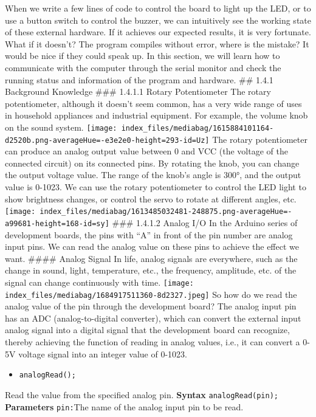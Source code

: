 \documentclass[
  letterpaper,
  DIV=11,
  numbers=noendperiod]{scrreprt}
\providecommand{\tightlist}{%
  \setlength{\itemsep}{0pt}\setlength{\parskip}{0pt}}\usepackage{longtable,booktabs,array}
\begin{document}
When we write a few lines of code to control the board to light up the
LED, or to use a button switch to control the buzzer, we can intuitively
see the working state of these external hardware. If it achieves our
expected results, it is very fortunate. What if it doesn't? The program
compiles without error, where is the mistake? It would be nice if they
could speak up. In this section, we will learn how to communicate with
the computer through the serial monitor and check the running status and
information of the program and hardware. \#\# 1.4.1 Background Knowledge
\#\#\# 1.4.1.1 Rotary Potentiometer The rotary potentiometer, although
it doesn't seem common, has a very wide range of uses in household
appliances and industrial equipment. For example, the volume knob on the
sound system.
\texttt{[image: index\_files/mediabag/1615884101164-d2520b.png-averageHue=-e3e2e0-height=293-id=Uz]}
The rotary potentiometer can produce an analog output value between 0
and VCC (the voltage of the connected circuit) on its connected pins. By
rotating the knob, you can change the output voltage value. The range of
the knob's angle is 300°, and the output value is 0-1023. We can use the
rotary potentiometer to control the LED light to show brightness
changes, or control the servo to rotate at different angles, etc.
\texttt{[image: index\_files/mediabag/1613485032481-248875.png-averageHue=-a99681-height=168-id=sy]}
\#\#\# 1.4.1.2 Analog I/O In the Arduino series of development boards,
the pins with ``A'' in front of the pin number are analog input pins. We
can read the analog value on these pins to achieve the effect we want.
\#\#\#\# Analog Signal In life, analog signals are everywhere, such as
the change in sound, light, temperature, etc., the frequency, amplitude,
etc. of the signal can change continuously with time.
\texttt{[image: index\_files/mediabag/1684917511360-8d2327.jpeg]} So how
do we read the analog value of the pin through the development board?
The analog input pin has an ADC (analog-to-digital converter), which can
convert the external input analog signal into a digital signal that the
development board can recognize, thereby achieving the function of
reading in analog values, i.e., it can convert a 0-5V voltage signal
into an integer value of 0-1023.

\begin{itemize}
\tightlist
\item
  \texttt{analogRead();}
\end{itemize}

Read the value from the specified analog pin. \textbf{Syntax}
\texttt{analogRead(pin);} \textbf{Parameters} \texttt{pin:}The name of
the analog input pin to be read.
\end{document}
